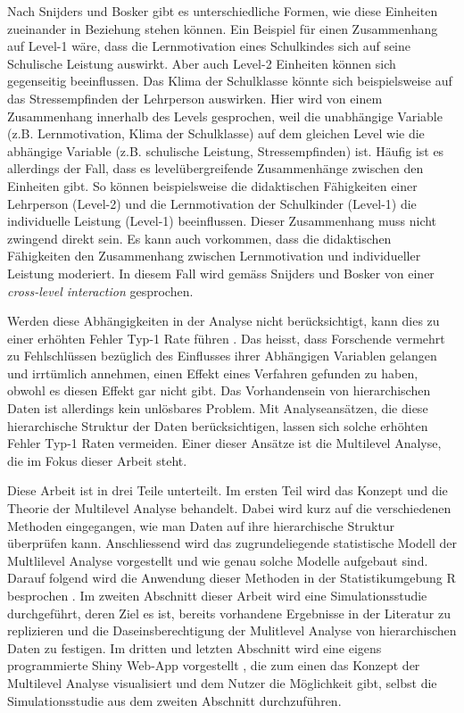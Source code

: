 \documentclass[12pt]{article}\usepackage[]{graphicx}\usepackage[]{color}
\numberwithin{equation}{section}
\begin{document}
Nach Snijders und Bosker \citeyearpar{SnijdersTomA.B2012Ma:a} gibt es unterschiedliche Formen, wie diese Einheiten zueinander in Beziehung stehen können. Ein Beispiel für einen Zusammenhang auf Level-1 wäre, dass die Lernmotivation eines Schulkindes sich auf seine Schulische Leistung auswirkt. Aber auch Level-2 Einheiten können sich gegenseitig beeinflussen. Das Klima der Schulklasse könnte sich beispielsweise auf das Stressempfinden der Lehrperson auswirken. Hier wird von einem Zusammenhang innerhalb des Levels gesprochen, weil die unabhängige Variable (z.B. Lernmotivation, Klima der Schulklasse) auf dem gleichen Level wie die abhängige Variable (z.B. schulische Leistung, Stressempfinden) ist. Häufig ist es allerdings der Fall, dass es levelübergreifende Zusammenhänge zwischen den Einheiten gibt. So können beispielsweise die didaktischen Fähigkeiten einer Lehrperson (Level-2) und die Lernmotivation der Schulkinder (Level-1) die individuelle Leistung (Level-1) beeinflussen. Dieser Zusammenhang muss nicht zwingend direkt sein. Es kann auch vorkommen, dass die didaktischen Fähigkeiten den Zusammenhang zwischen Lernmotivation und individueller Leistung moderiert. In diesem Fall wird gemäss Snijders und Bosker \citeyearpar{SnijdersTomA.B2012Ma:a} von einer \textit{cross-level interaction} gesprochen.

Werden diese Abhängigkeiten in der Analyse nicht berücksichtigt, kann dies zu einer erhöhten Fehler Typ-1 Rate führen \citep{dorman2008effect, mcneish2014analyzing}. Das heisst, dass Forschende vermehrt zu Fehlschlüssen bezüglich des Einflusses ihrer Abhängigen Variablen gelangen und irrtümlich annehmen, einen Effekt eines Verfahren gefunden zu haben, obwohl es diesen Effekt gar nicht gibt. Das Vorhandensein von hierarchischen Daten ist allerdings kein unlösbares Problem. Mit Analyseansätzen, die diese hierarchische Struktur der Daten berücksichtigen, lassen sich solche erhöhten Fehler Typ-1 Raten vermeiden. Einer dieser Ansätze ist die Multilevel Analyse, die im Fokus dieser Arbeit steht.

Diese Arbeit ist in drei Teile unterteilt. Im ersten Teil wird das Konzept und die Theorie der Multilevel Analyse behandelt. Dabei wird kurz auf die verschiedenen Methoden eingegangen, wie man Daten auf ihre hierarchische Struktur überprüfen kann. Anschliessend wird das zugrundeliegende statistische Modell der Multlilevel Analyse vorgestellt und wie genau solche Modelle aufgebaut sind. Darauf folgend wird die Anwendung dieser Methoden in der Statistikumgebung R besprochen \citep{R}. Im zweiten Abschnitt dieser Arbeit wird eine Simulationsstudie durchgeführt, deren Ziel es ist, bereits vorhandene Ergebnisse in der Literatur zu replizieren und die Daseinsberechtigung der Mulitlevel Analyse von hierarchischen Daten zu festigen. Im dritten und letzten Abschnitt wird eine eigens programmierte Shiny Web-App vorgestellt \citep{shiny}, die zum einen das Konzept der Multilevel Analyse visualisiert und dem Nutzer die Möglichkeit gibt, selbst die Simulationsstudie aus dem zweiten Abschnitt durchzuführen. 
\end{document}
